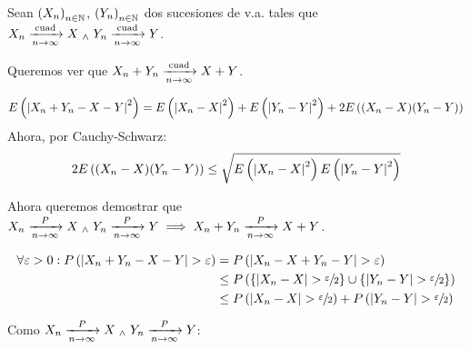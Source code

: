  Sean $\left(X_n\right)_{n\in\mathbb{N}}$, $\left(Y_n\right)_{n\in\mathbb{N}}$ dos sucesiones de v.a. tales que $X_n \xrightarrow[n\to\infty]{\text{cuad}} X \; _{\wedge} \; Y_n \xrightarrow[n\to\infty]{\text{cuad}} Y$.

Queremos ver que $X_n + Y_n \xrightarrow[n\to\infty]{\text{cuad}} X + Y$.
\begin{dem} %
	\[E\left(\left|X_n + Y_n - X - Y\right|^2\right) = E\left(\left|X_n - X\right|^2\right) + E\left(\left|Y_n - Y\right|^2\right) + 2E\left((X_n - X)(Y_n - Y)\right)\]
	Ahora, por Cauchy-Schwarz:
	\[2E\left((X_n - X)(Y_n - Y)\right) \leq \sqrt{E\left(\left|X_n - X\right|^2\right)E\left(\left|Y_n - Y\right|^2\right)}\]
\end{dem}

Ahora queremos demostrar que $X_n \xrightarrow[n\to\infty]{P} X \; _{\wedge} \; Y_n \xrightarrow[n\to\infty]{P} Y \implies X_n + Y_n \xrightarrow[n\to\infty]{P} X + Y$.
\begin{dem}%
	\[\begin{aligned}
			\forall \varepsilon > 0 : P\left(\left|X_n + Y_n - X - Y\right| > \varepsilon\right) & = P\left(\left|X_n - X + Y_n - Y\right| > \varepsilon\right)                                                            \\
			                                                                              & \leq P\left(\{\left|X_n - X\right| > \sfrac{\varepsilon}{2}\} \cup \{\left|Y_n - Y\right| > \sfrac{\varepsilon}{2}\}\right)    \\
			                                                                              & \leq P\left(\left|X_n - X\right| > \sfrac{\varepsilon}{2}\right) + P\left(\left|Y_n - Y\right| > \sfrac{\varepsilon}{2}\right)
		\end{aligned}\]

	Como $X_n \xrightarrow[n\to\infty]{P} X \; _{\wedge} \; Y_n \xrightarrow[n\to\infty]{P} Y$:
\end{dem}